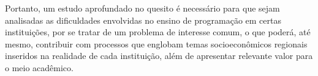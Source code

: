 Portanto, um estudo aprofundado no quesito é necessário para que sejam analisadas as dificuldades envolvidas no ensino de programação em certas instituições, por se tratar de um problema de interesse comum, o que poderá, até mesmo, contribuir com processos que englobam temas socioeconômicos regionais inseridos na realidade de cada instituição, além de apresentar relevante valor para o meio acadêmico. 

